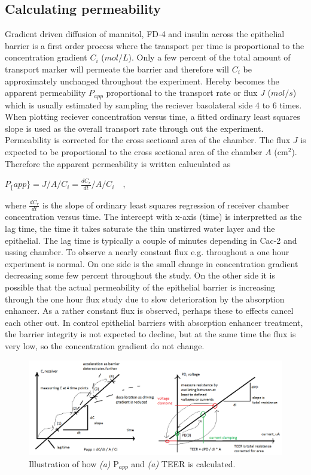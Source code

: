 \subsection{Calculating permeability}
Gradient driven diffusion of mannitol, FD-4 and insulin across the epithelial barrier is a first order process where the transport per time is proportional to the concentration gradient $C_i$ ($mol/L$). Only a few percent of the total amount of transport marker will permeate the barrier and therefore will $C_i$ be approximately unchanged throughout the experiment. Hereby becomes the apparent permeability $P_{app}$ proportional to the transport rate or flux $J$ ($mol/s$) which is usually estimated by sampling the reciever basolateral side 4 to 6 times. When plotting reciever concentration versus time, a fitted ordinary least squares slope is used as the overall transport rate through out the experiment. Permeability is corrected for the cross sectional area of the chamber. The flux $J$ is expected to be proportional to the cross sectional area of the chamber $A$ (cm$^2$).  Therefore the apparent permeability is written caluculated as

$P_\{app\} = J/A/C_i = \frac{dC_r}{dt}/A/C_i \quad ,$

where $\frac{dC_r}{dt}$ is the slope of ordinary least squares regression of receiver chamber concentration versus time. The intercept with x-axis (time) is interpretted as the lag time, the time it takes saturate the thin unstirred water layer and the epithelial. The lag time is typically a couple of minutes depending in Cac-2 and ussing chamber. To observe a nearly constant flux e.g. throughout a one hour experiment is normal. On one side is the small change in concentration gradient decreasing some few percent throughout the study. On the other side it is possible that the actual permeability of the epithelial barrier is increasing through the one hour flux study due to slow deterioration by the absorption enhancer. As a rather constant flux is observed, perhaps these to effects cancel each other out. In control epithelial barriers with absorption enhancer treatment, the barrier integrity is not expected to decline, but at the same time the flux is very low, so the concentration gradient do not change.

\begin{figure}[ht]
\label{meassure_TEERPapp}
\includegraphics[width=\textwidth,height=\textheight,keepaspectratio]{graphics/sketch_measuring_permeability.png}
\caption{Illustration of how \textit{(a)} P$_{app}$ and \textit{(a)}  TEER is calculated.}
\end{figure}


